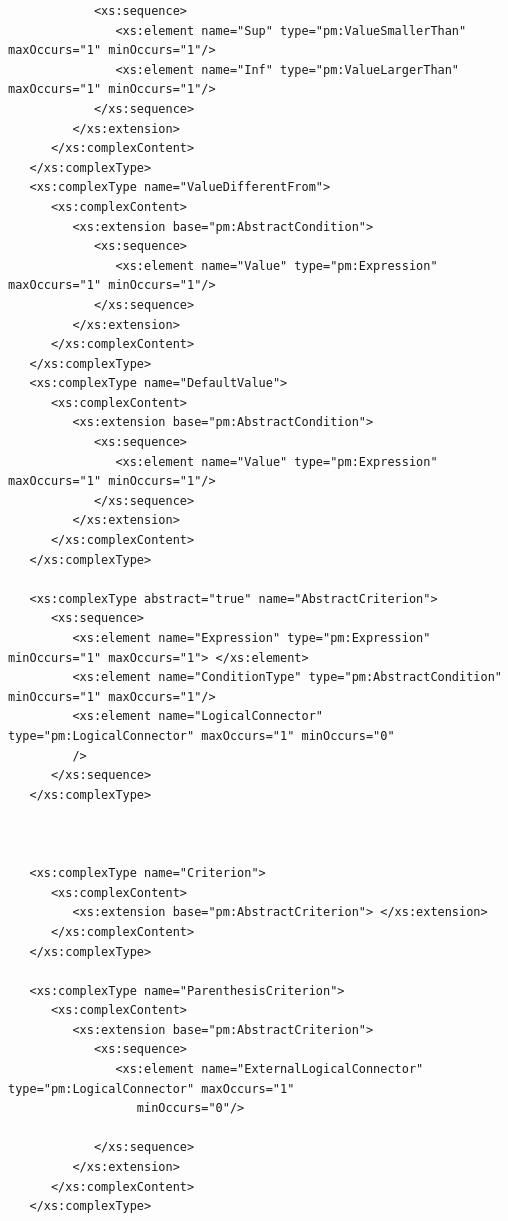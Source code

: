 \documentclass[a4paper,11pt] {ivoa}
\begin{document}
\begin{lstlisting}
            <xs:sequence>
               <xs:element name="Sup" type="pm:ValueSmallerThan" maxOccurs="1" minOccurs="1"/>
               <xs:element name="Inf" type="pm:ValueLargerThan" maxOccurs="1" minOccurs="1"/>
            </xs:sequence>
         </xs:extension>
      </xs:complexContent>
   </xs:complexType>
   <xs:complexType name="ValueDifferentFrom">
      <xs:complexContent>
         <xs:extension base="pm:AbstractCondition">
            <xs:sequence>
               <xs:element name="Value" type="pm:Expression" maxOccurs="1" minOccurs="1"/>
            </xs:sequence>
         </xs:extension>
      </xs:complexContent>
   </xs:complexType>
   <xs:complexType name="DefaultValue">
      <xs:complexContent>
         <xs:extension base="pm:AbstractCondition">
            <xs:sequence>
               <xs:element name="Value" type="pm:Expression" maxOccurs="1" minOccurs="1"/>
            </xs:sequence>
         </xs:extension>
      </xs:complexContent>
   </xs:complexType>

   <xs:complexType abstract="true" name="AbstractCriterion">
      <xs:sequence>
         <xs:element name="Expression" type="pm:Expression" minOccurs="1" maxOccurs="1"> </xs:element>
         <xs:element name="ConditionType" type="pm:AbstractCondition" minOccurs="1" maxOccurs="1"/>
         <xs:element name="LogicalConnector" type="pm:LogicalConnector" maxOccurs="1" minOccurs="0"
         />
      </xs:sequence>
   </xs:complexType>



   <xs:complexType name="Criterion">
      <xs:complexContent>
         <xs:extension base="pm:AbstractCriterion"> </xs:extension>
      </xs:complexContent>
   </xs:complexType>

   <xs:complexType name="ParenthesisCriterion">
      <xs:complexContent>
         <xs:extension base="pm:AbstractCriterion">
            <xs:sequence>
               <xs:element name="ExternalLogicalConnector" type="pm:LogicalConnector" maxOccurs="1"
                  minOccurs="0"/>

            </xs:sequence>
         </xs:extension>
      </xs:complexContent>
   </xs:complexType>


\end{lstlisting}
\end{document}
